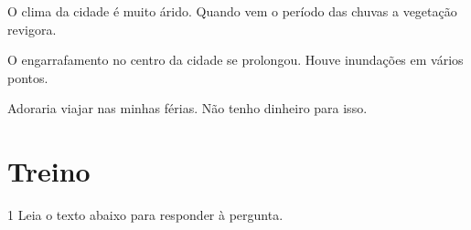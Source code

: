 \begin{escolha}

  \item O clima da cidade é muito árido. Quando vem o período das chuvas a
  vegetação revigora.

\item{}
  
  \item O engarrafamento no centro da cidade se prolongou. Houve inundações em
  vários pontos.

\item{}
  
  \item Adoraria viajar nas minhas férias. Não tenho dinheiro para isso.

\item{}

\end{escolha}

\section*{Treino}

\num{1} Leia o texto abaixo para responder à pergunta.

